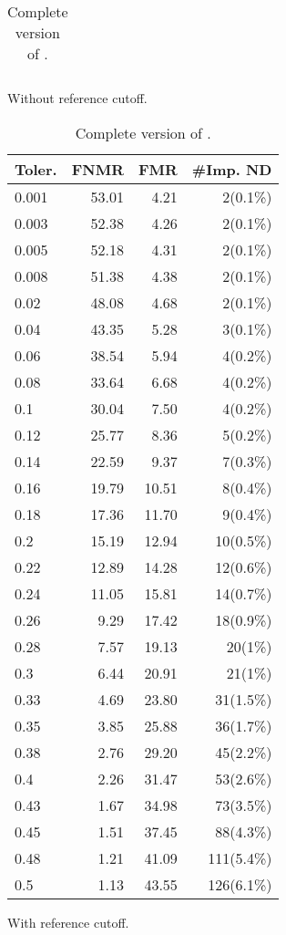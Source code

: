 \begin{table}[htbp]
\begin{subtable}[h]{0.45\textwidth}
\begin{tabular}{lrrr}
 \end{tabular}
 \caption{Without reference cutoff.}
 \label{tab:app-PA-without-cutoff}
\end{subtable}
\hfill
\begin{subtable}[h]{0.45\textwidth}
\centering
\begin{tabular}{lrrr}
\hline
Toler. & FNMR  & FMR & \#Imp. ND \\ \hline
0.001 & 53.01 & 4.21  & 2(0.1\%)   \\
0.003 & 52.38 & 4.26  & 2(0.1\%)   \\
0.005 & 52.18 & 4.31  & 2(0.1\%)   \\
0.008 & 51.38 & 4.38  & 2(0.1\%)   \\
0.02  & 48.08 & 4.68  & 2(0.1\%)   \\
0.04  & 43.35 & 5.28  & 3(0.1\%)   \\
0.06  & 38.54 & 5.94  & 4(0.2\%)   \\
0.08  & 33.64 & 6.68  & 4(0.2\%)   \\
0.1   & 30.04 & 7.50  & 4(0.2\%)   \\
0.12  & 25.77 & 8.36  & 5(0.2\%)   \\
0.14  & 22.59 & 9.37  & 7(0.3\%)   \\
0.16  & 19.79 & 10.51 & 8(0.4\%)   \\
0.18  & 17.36 & 11.70 & 9(0.4\%)   \\
0.2   & 15.19 & 12.94 & 10(0.5\%)  \\
0.22  & 12.89 & 14.28 & 12(0.6\%)  \\
0.24  & 11.05 & 15.81 & 14(0.7\%)  \\
0.26  & 9.29  & 17.42 & 18(0.9\%)  \\
0.28  & 7.57  & 19.13 & 20(1\%)    \\
0.3   & 6.44  & 20.91 & 21(1\%)    \\
0.33  & 4.69  & 23.80 & 31(1.5\%)  \\
0.35  & 3.85  & 25.88 & 36(1.7\%)  \\
0.38  & 2.76  & 29.20 & 45(2.2\%)  \\
0.4   & 2.26  & 31.47 & 53(2.6\%)  \\
0.43  & 1.67  & 34.98 & 73(3.5\%)  \\
0.45  & 1.51  & 37.45 & 88(4.3\%)  \\
0.48  & 1.21  & 41.09 & 111(5.4\%) \\
0.5   & 1.13  & 43.55 & 126(6.1\%)
\end{tabular}
\caption{With reference cutoff.}
\label{tab:app-PA-with-cutoff}
\end{subtable}
\caption{Complete version of .}
\label{tab:app-PA-cutoff}
\end{table}






